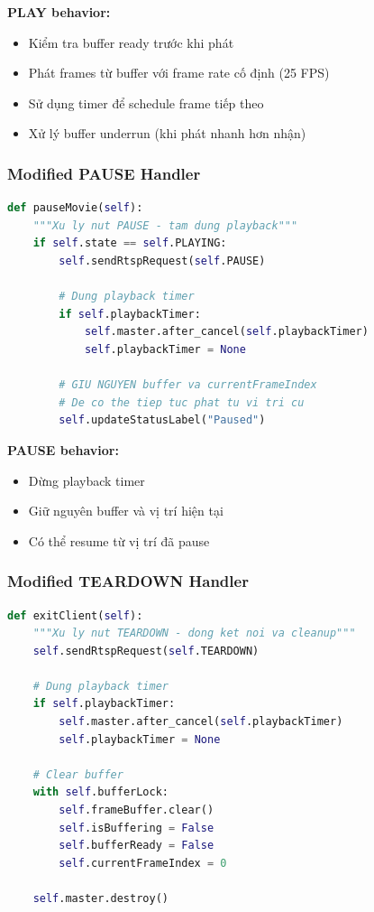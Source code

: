 \documentclass[a4paper,12pt]{article}
\begin{document}
\textbf{PLAY behavior:}
\begin{itemize}
    \item Kiểm tra buffer ready trước khi phát
    \item Phát frames từ buffer với frame rate cố định (25 FPS)
    \item Sử dụng timer để schedule frame tiếp theo
    \item Xử lý buffer underrun (khi phát nhanh hơn nhận)
\end{itemize}

\subsubsection{Modified PAUSE Handler}

\begin{lstlisting}[language=Python, caption={PAUSE with Buffer}]
def pauseMovie(self):
    """Xu ly nut PAUSE - tam dung playback"""
    if self.state == self.PLAYING:
        self.sendRtspRequest(self.PAUSE)
        
        # Dung playback timer
        if self.playbackTimer:
            self.master.after_cancel(self.playbackTimer)
            self.playbackTimer = None
        
        # GIU NGUYEN buffer va currentFrameIndex
        # De co the tiep tuc phat tu vi tri cu
        self.updateStatusLabel("Paused")
\end{lstlisting}

\textbf{PAUSE behavior:}
\begin{itemize}
    \item Dừng playback timer
    \item Giữ nguyên buffer và vị trí hiện tại
    \item Có thể resume từ vị trí đã pause
\end{itemize}

\subsubsection{Modified TEARDOWN Handler}

\begin{lstlisting}[language=Python, caption={TEARDOWN with Buffer Cleanup}]
def exitClient(self):
    """Xu ly nut TEARDOWN - dong ket noi va cleanup"""
    self.sendRtspRequest(self.TEARDOWN)
    
    # Dung playback timer
    if self.playbackTimer:
        self.master.after_cancel(self.playbackTimer)
        self.playbackTimer = None
    
    # Clear buffer
    with self.bufferLock:
        self.frameBuffer.clear()
        self.isBuffering = False
        self.bufferReady = False
        self.currentFrameIndex = 0
    
    self.master.destroy()
\end{lstlisting}
\end{document}
